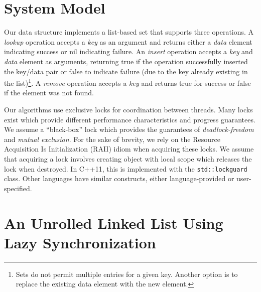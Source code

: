 \documentclass{llncs}
\begin{document}
\section{System Model}\label{Section:Model}
Our data structure implements a list-based set that supports
three operations.  A {\em lookup} operation accepts a {\em key} as an argument and returns either
a {\em data} element indicating success or {\sc nil} indicating failure.  An {\em insert}
operation accepts a {\em key} and {\em data} element as arguments, returning
{\sc true} if the operation successfully inserted the key/data pair or 
{\sc false} to indicate failure (due to the key already existing in the 
list)\footnote{Sets do not permit multiple entries for a given key.  Another option
is to replace the existing data element with the new element.}. 
A {\em remove} operation accepts a {\em key} and returns {\sc true} for success or {\sc false}
if the element was not found.

Our algorithms use exclusive locks for coordination between threads.  
Many locks exist which provide different performance characteristics and
progress guarantees.  We assume a ``black-box'' lock which provides the
guarantees of {\em deadlock-freedom} and {\em mutual exclusion}.  For the sake of brevity, 
we rely on the Resource Acquisition Is Initialization (RAII)\cite{Stroustrup:Design}
idiom when acquiring these locks.  We assume that acquiring a lock involves creating
object with local scope which releases the lock when destroyed. 
In C++11, this is implemented with the \texttt{std::lock\underline{\hspace{5pt}}guard} class.
Other languages have similar constructs, either language-provided or user-specified. 

\section{An Unrolled Linked List Using Lazy Synchronization}\label{Section:Algorithms}
\end{document}
